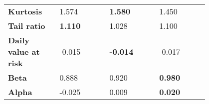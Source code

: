 \begin{table}[ht!]
{\begin{tabular}{*{4}{|m{0.20\linewidth}|}}
                      \bfseries Kurtosis            & 1.574                                & \color[HTML]{00F000} \bfseries 1.580  & 1.450 \\[0.4cm]
                      \bfseries Tail ratio          & \color[HTML]{00F000} \bfseries 1.110 & 1.028                                 & 1.100 \\[0.4cm]
                      \bfseries Daily value at risk & -0.015                               & \color[HTML]{00F000} \bfseries -0.014 & -0.017 \\[0.4cm]
                      \bfseries Beta                & 0.888                                & 0.920                                 & \color[HTML]{00F000} \bfseries 0.980 \\[0.4cm]
                      \bfseries Alpha               & -0.025                               & 0.009                                 & \color[HTML]{00F000} \bfseries 0.020 \\[0.4cm]
                      \bottomrule
    \end{tabular}}
\end{table}
